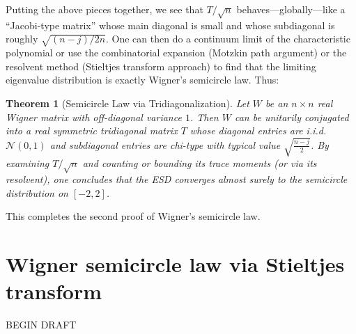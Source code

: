 \documentclass[letterpaper,11pt,oneside,reqno]{article}
\numberwithin{equation}{section}
\newtheorem{theorem}[proposition]{Theorem}
\theoremstyle{definition}
\begin{document}
Putting the above pieces together, we see that $T/\sqrt{n}$ behaves—globally—like a “Jacobi-type matrix” whose main diagonal is small and whose subdiagonal is roughly $\sqrt{(n-j)/2n}$.  One can then do a continuum limit of the characteristic polynomial or use the combinatorial expansion (Motzkin path argument) or the resolvent method (Stieltjes transform approach) to find that the limiting eigenvalue distribution is exactly Wigner’s semicircle law.  Thus:

\begin{theorem}[Semicircle Law via Tridiagonalization]
\label{thm:sc-via-tridiag}
Let $W$ be an $n\times n$ real Wigner matrix with off-diagonal variance $1$. Then $W$ can be unitarily conjugated into a real symmetric tridiagonal matrix $T$ whose diagonal entries are i.i.d.\ $\mathcal{N}(0,1)$ and subdiagonal entries are chi-type with typical value $\sqrt{\tfrac{n-j}{2}}$.  By examining $T/\sqrt{n}$ and counting or bounding its trace moments (or via its resolvent), one concludes that the ESD converges almost surely to the semicircle distribution on $[-2,2]$. 
\end{theorem}

This completes the second proof of Wigner’s semicircle law.




\section{Wigner semicircle law via Stieltjes transform}
\label{sec:semicircle-tridiagonal}





BEGIN DRAFT

\end{document}
